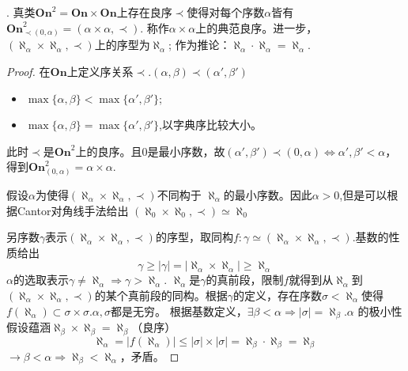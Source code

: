 \begin{Them}.
    真类$\mathbf{On}^2=\mathbf{On}\times \mathbf{On}$上存在良序$\prec$使得对每个序数$\alpha$皆有
    $\mathbf{On}^2_{\prec(0,\alpha)} =(\alpha \times \alpha, \prec)$. 称作$\alpha \times \alpha $上的典范良序。进一步，$(\aleph_{\alpha}\times\aleph_{\alpha}, \prec)$上的序型为$\aleph_{\alpha}$; 作为推论：$\aleph_{\alpha}\cdot \aleph_{\alpha}=\aleph_{\alpha}$.

    \begin{proof}
        在$\mathbf{On}$上定义序关系$\prec. (\alpha ,\beta )\prec(\alpha', \beta')$
        \begin{itemize}
            \item $\max\{\alpha, \beta \}<\max\{\alpha',\beta'\}$;
            \item $\max\{\alpha, \beta \}=\max\{\alpha', \beta'\}$,以字典序比较大小。
        \end{itemize}
        此时$\prec$是$\mathbf{On}^2$上的良序。且$0$是最小序数，故$(\alpha', \beta')\prec(0,\alpha)\Leftrightarrow \alpha',\beta'<\alpha$，得到$\mathbf{On}^2_{(0,\alpha)}=\alpha \times \alpha$.

        假设$\alpha$为使得$(\aleph_{\alpha}\times \aleph_{\alpha}, \prec)$不同构于 $\aleph_{\alpha}$的最小序数。因此$\alpha >0$,但是可以根据Cantor对角线手法给出
        $(\aleph_0\times \aleph_0, \prec)\simeq \aleph_0$

        另序数$\gamma$表示$(\aleph_{\alpha}\times\aleph_{\alpha},\prec)$的序型，取同构$f:\gamma\simeq(\aleph_{\alpha}\times\aleph_{\alpha}, \prec)$.基数的性质给出
        \[
            \gamma \geq |\gamma| = |\aleph_{\alpha}\times \aleph_{\alpha}|\geq \aleph_{\alpha}
        \]
        $\alpha$的选取表示$\gamma \neq \aleph_{\alpha} \Rightarrow \gamma > \aleph_{\alpha}$. $\aleph_{\alpha}$是$\gamma$的真前段，限制$f$就得到从$\aleph_{\alpha}$到$(\aleph_{\alpha}\times\aleph_{\alpha},\prec)$的某个真前段的同构。根据$\gamma$的定义，存在序数$\sigma < \aleph_{\alpha}$使得$f(\aleph_{\alpha})\subset \sigma \times \sigma$.$\alpha, \sigma$都是无穷。
        根据基数定义，$\exists \beta <\alpha \Rightarrow |\sigma|=\aleph_{\beta}$.$\alpha$ 的极小性假设蕴涵$\aleph_{\beta}\times \aleph_{\beta}=\aleph_{\beta}$（良序）
        \[
            \aleph_{\alpha}=|f(\aleph_{\alpha})|\leq |\sigma|\times|\sigma|=\aleph_{\beta}\cdot\aleph_{\beta}=\aleph_{\beta}
        \]
        $\rightarrow \beta < \alpha\Rightarrow \aleph_{\beta}<\aleph_{\alpha}$，矛盾。
    \end{proof}
\end{Them}


